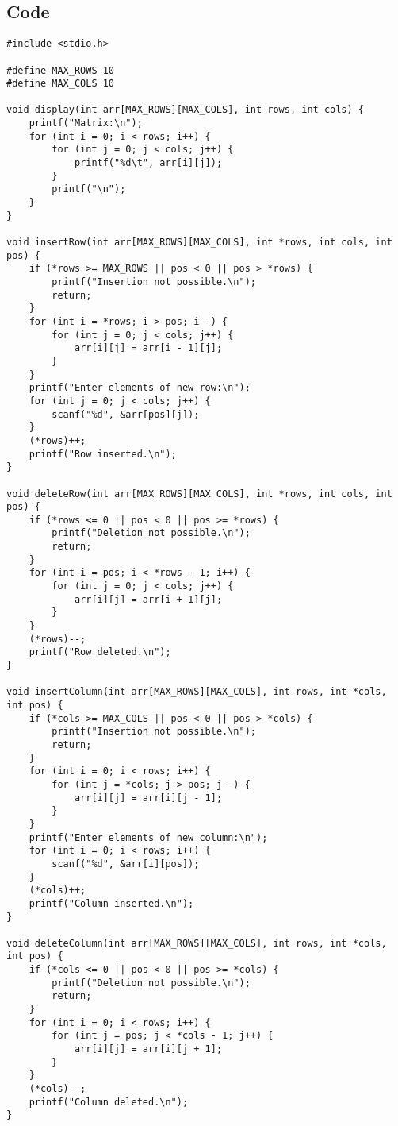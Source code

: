 \documentclass[12pt,a4paper]{article}
\begin{document}
\subsection*{Code}
\begin{lstlisting}
#include <stdio.h>

#define MAX_ROWS 10
#define MAX_COLS 10

void display(int arr[MAX_ROWS][MAX_COLS], int rows, int cols) {
    printf("Matrix:\n");
    for (int i = 0; i < rows; i++) {
        for (int j = 0; j < cols; j++) {
            printf("%d\t", arr[i][j]);
        }
        printf("\n");
    }
}

void insertRow(int arr[MAX_ROWS][MAX_COLS], int *rows, int cols, int pos) {
    if (*rows >= MAX_ROWS || pos < 0 || pos > *rows) {
        printf("Insertion not possible.\n");
        return;
    }
    for (int i = *rows; i > pos; i--) {
        for (int j = 0; j < cols; j++) {
            arr[i][j] = arr[i - 1][j];
        }
    }
    printf("Enter elements of new row:\n");
    for (int j = 0; j < cols; j++) {
        scanf("%d", &arr[pos][j]);
    }
    (*rows)++;
    printf("Row inserted.\n");
}

void deleteRow(int arr[MAX_ROWS][MAX_COLS], int *rows, int cols, int pos) {
    if (*rows <= 0 || pos < 0 || pos >= *rows) {
        printf("Deletion not possible.\n");
        return;
    }
    for (int i = pos; i < *rows - 1; i++) {
        for (int j = 0; j < cols; j++) {
            arr[i][j] = arr[i + 1][j];
        }
    }
    (*rows)--;
    printf("Row deleted.\n");
}

void insertColumn(int arr[MAX_ROWS][MAX_COLS], int rows, int *cols, int pos) {
    if (*cols >= MAX_COLS || pos < 0 || pos > *cols) {
        printf("Insertion not possible.\n");
        return;
    }
    for (int i = 0; i < rows; i++) {
        for (int j = *cols; j > pos; j--) {
            arr[i][j] = arr[i][j - 1];
        }
    }
    printf("Enter elements of new column:\n");
    for (int i = 0; i < rows; i++) {
        scanf("%d", &arr[i][pos]);
    }
    (*cols)++;
    printf("Column inserted.\n");
}

void deleteColumn(int arr[MAX_ROWS][MAX_COLS], int rows, int *cols, int pos) {
    if (*cols <= 0 || pos < 0 || pos >= *cols) {
        printf("Deletion not possible.\n");
        return;
    }
    for (int i = 0; i < rows; i++) {
        for (int j = pos; j < *cols - 1; j++) {
            arr[i][j] = arr[i][j + 1];
        }
    }
    (*cols)--;
    printf("Column deleted.\n");
}


\end{lstlisting}
\end{document}
